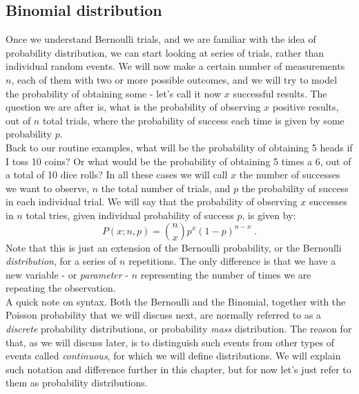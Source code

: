 \documentclass{book}
\begin{document}
\subsection{Binomial distribution}

Once we understand Bernoulli trials, and we are familiar with the idea of probability distribution, we can start looking at series of trials, rather than individual random events. We will now make a certain number of measurements $n$, each of them with two or more possible outcomes, and we will try to model the probability of obtaining some - let's call it now $x$ successful results. The question we are after is, what is the probability of observing $x$ positive results, out of $n$ total trials, where the probability of success each time is given by some probability $p$.\\

Back to our routine examples, what will be the probability of obtaining 5 heads if I toss 10 coins? Or what would be the probability of obtaining 5 times a 6, out of a total of 10 dice rolls? In all these cases we will call $x$ the number of successes we want to observe, $n$ the total number of trials, and $p$ the probability of success in each individual trial. We will say that the probability of observing $x$ successes in $n$ total tries, given individual probability of success $p$, is given by:
\begin{equation}
    P(x; n, p) = \binom{n}{x} p^x (1 - p)^{n - x} \; .
    \label{eq:binomial}
\end{equation}
Note that this is just an extension of the Bernoulli probability, or the Bernoulli \textit{distribution}, for a series of $n$ repetitions. The only difference is that we have a new variable - or \textit{parameter} - $n$ representing the number of times we are repeating the observation.\\

A quick note on syntax. Both the Bernoulli and the Binomial, together with the Poisson probability that we will discuss next, are normally referred to as a \textit{discrete} probability distributions, or probability \textit{mass} distribution. The reason for that, as we will discuss later, is to distinguish such events from other types of events called \textit{continuous}, for which we will define  distributions. We will explain such notation and difference further in this chapter, but for now let's just refer to them as probability distributions.\\
\end{document}
